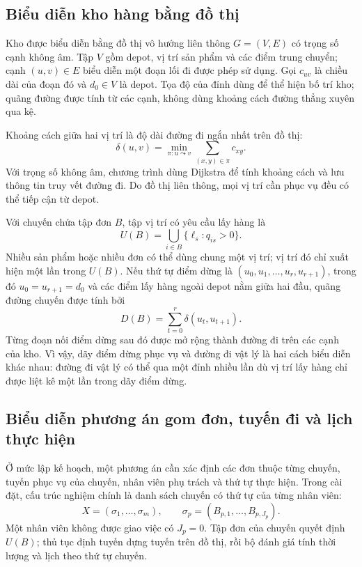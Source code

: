 \subsection{Biểu diễn kho hàng bằng đồ thị}

Kho được biểu diễn bằng đồ thị vô hướng liên thông $G=(V,E)$ có trọng số cạnh không âm. Tập $V$ gồm depot, vị trí sản phẩm và các điểm trung chuyển; cạnh $(u,v)\in E$ biểu diễn một đoạn lối đi được phép sử dụng. Gọi $c_{uv}$ là chiều dài của đoạn đó và $d_0\in V$ là depot. Tọa độ của đỉnh dùng để thể hiện bố trí kho; quãng đường được tính từ các cạnh, không dùng khoảng cách đường thẳng xuyên qua kệ.

Khoảng cách giữa hai vị trí là độ dài đường đi ngắn nhất trên đồ thị:
\begin{equation}
 \delta(u,v)=\min_{\pi:u\leadsto v}\sum_{(x,y)\in\pi}c_{xy}.\label{eq:model-graph-distance}
\end{equation}
Với trọng số không âm, chương trình dùng Dijkstra để tính khoảng cách và lưu thông tin truy vết đường đi. Do đồ thị liên thông, mọi vị trí cần phục vụ đều có thể tiếp cận từ depot.

Với chuyến chứa tập đơn $B$, tập vị trí có yêu cầu lấy hàng là
\begin{equation}
 U(B)=\bigcup_{i\in B}\{\ell_s:q_{is}>0\}.\label{eq:model-required-locations}
\end{equation}
Nhiều sản phẩm hoặc nhiều đơn có thể dùng chung một vị trí; vị trí đó chỉ xuất hiện một lần trong $U(B)$. Nếu thứ tự điểm dừng là $(u_0,u_1,\ldots,u_r,u_{r+1})$, trong đó $u_0=u_{r+1}=d_0$ và các điểm lấy hàng ngoài depot nằm giữa hai đầu, quãng đường chuyến được tính bởi
\begin{equation}
 D(B)=\sum_{t=0}^{r}\delta(u_t,u_{t+1}).\label{eq:model-batch-distance}
\end{equation}
Từng đoạn nối điểm dừng sau đó được mở rộng thành đường đi trên các cạnh của kho. Vì vậy, dãy điểm dừng phục vụ và đường đi vật lý là hai cách biểu diễn khác nhau: đường đi vật lý có thể qua một đỉnh nhiều lần dù vị trí lấy hàng chỉ được liệt kê một lần trong dãy điểm dừng.

\subsection{Biểu diễn phương án gom đơn, tuyến đi và lịch thực hiện}

Ở mức lập kế hoạch, một phương án cần xác định các đơn thuộc từng chuyến, tuyến phục vụ của chuyến, nhân viên phụ trách và thứ tự thực hiện. Trong cài đặt, cấu trúc nghiệm chính là danh sách chuyến có thứ tự của từng nhân viên:
\begin{equation}
 X=(\sigma_1,\ldots,\sigma_m),\qquad
 \sigma_p=(B_{p,1},\ldots,B_{p,J_p}).\label{eq:model-plan}
\end{equation}
Một nhân viên không được giao việc có $J_p=0$. Tập đơn của chuyến quyết định $U(B)$; thủ tục định tuyến dựng tuyến trên đồ thị, rồi bộ đánh giá tính thời lượng và lịch theo thứ tự chuyến.

